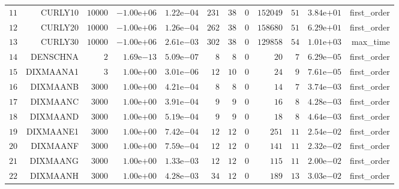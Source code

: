 \begin{longtable}{rrrrrrrrrrrr}
  \(    11\) & CURLY10 & \( 10000\) & \(-1.00\)e\(+06\) & \( 1.22\)e\(-04\) & \(   231\) & \(    38\) & \(     0\) & \(152049\) & \(    51\) & \( 3.84\)e\(+01\) & first\_order \\
  \(    12\) & CURLY20 & \( 10000\) & \(-1.00\)e\(+06\) & \( 1.26\)e\(-04\) & \(   262\) & \(    38\) & \(     0\) & \(158680\) & \(    51\) & \( 6.29\)e\(+01\) & first\_order \\
  \(    13\) & CURLY30 & \( 10000\) & \(-1.00\)e\(+06\) & \( 2.61\)e\(-03\) & \(   302\) & \(    38\) & \(     0\) & \(129858\) & \(    54\) & \( 1.01\)e\(+03\) & max\_time \\
  \(    14\) & DENSCHNA & \(     2\) & \( 1.69\)e\(-13\) & \( 5.09\)e\(-07\) & \(     8\) & \(     8\) & \(     0\) & \(    20\) & \(     7\) & \( 6.29\)e\(-05\) & first\_order \\
  \(    15\) & DIXMAANA1 & \(     3\) & \( 1.00\)e\(+00\) & \( 3.01\)e\(-06\) & \(    12\) & \(    10\) & \(     0\) & \(    24\) & \(     9\) & \( 7.61\)e\(-05\) & first\_order \\
  \(    16\) & DIXMAANB & \(  3000\) & \( 1.00\)e\(+00\) & \( 4.21\)e\(-04\) & \(     8\) & \(     8\) & \(     0\) & \(    14\) & \(     7\) & \( 3.74\)e\(-03\) & first\_order \\
  \(    17\) & DIXMAANC & \(  3000\) & \( 1.00\)e\(+00\) & \( 3.91\)e\(-04\) & \(     9\) & \(     9\) & \(     0\) & \(    16\) & \(     8\) & \( 4.28\)e\(-03\) & first\_order \\
  \(    18\) & DIXMAAND & \(  3000\) & \( 1.00\)e\(+00\) & \( 5.19\)e\(-04\) & \(     9\) & \(     9\) & \(     0\) & \(    18\) & \(     8\) & \( 4.64\)e\(-03\) & first\_order \\
  \(    19\) & DIXMAANE1 & \(  3000\) & \( 1.00\)e\(+00\) & \( 7.42\)e\(-04\) & \(    12\) & \(    12\) & \(     0\) & \(   251\) & \(    11\) & \( 2.54\)e\(-02\) & first\_order \\
  \(    20\) & DIXMAANF & \(  3000\) & \( 1.00\)e\(+00\) & \( 7.59\)e\(-04\) & \(    12\) & \(    12\) & \(     0\) & \(   141\) & \(    11\) & \( 2.32\)e\(-02\) & first\_order \\
  \(    21\) & DIXMAANG & \(  3000\) & \( 1.00\)e\(+00\) & \( 1.33\)e\(-03\) & \(    12\) & \(    12\) & \(     0\) & \(   115\) & \(    11\) & \( 2.00\)e\(-02\) & first\_order \\
  \(    22\) & DIXMAANH & \(  3000\) & \( 1.00\)e\(+00\) & \( 4.28\)e\(-03\) & \(    34\) & \(    12\) & \(     0\) & \(   189\) & \(    13\) & \( 3.03\)e\(-02\) & first\_order \\

\end{longtable}
